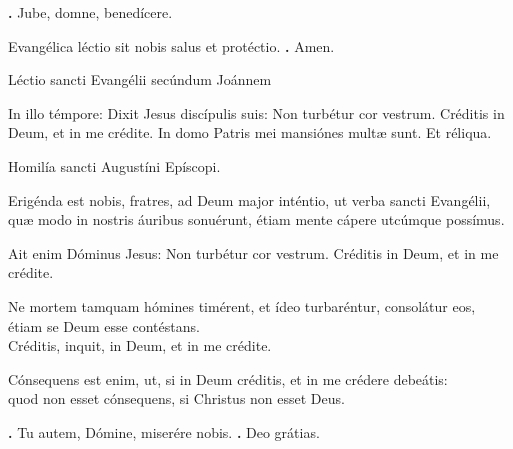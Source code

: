 \begin{small}
\textbf{\Vbar.} Jube, domne, benedícere.

Evangélica léctio sit nobis salus et protéctio.
\textbf{\Rbar.} Amen.
\end{small}


Léctio sancti Evangélii secúndum Joánnem

In illo témpore: Dixit Jesus discípulis suis: Non turbétur cor vestrum. 
Créditis in Deum, et in me crédite. 
In domo Patris mei mansiónes multæ sunt. Et réliqua.

Homilía sancti Augustíni Epíscopi.

Erigénda est nobis, fratres, ad Deum major inténtio, ut verba sancti Evangélii, quæ modo in nostris áuribus sonuérunt, étiam mente cápere utcúmque possímus. 

Ait enim Dóminus Jesus: Non turbétur cor vestrum. Créditis in Deum, et in me crédite. 

Ne mortem tamquam hómines timérent, et ídeo turbaréntur, consolátur eos, étiam se Deum esse contéstans. \\
Créditis, inquit, in Deum, et in me crédite. 

Cónsequens est enim, ut, si in Deum créditis, et in me crédere debeátis: \\
quod non esset cónsequens, si Christus non esset Deus.

\textbf{\Vbar.} Tu autem, Dómine, miserére nobis.
\textbf{\Rbar.} Deo grátias.

